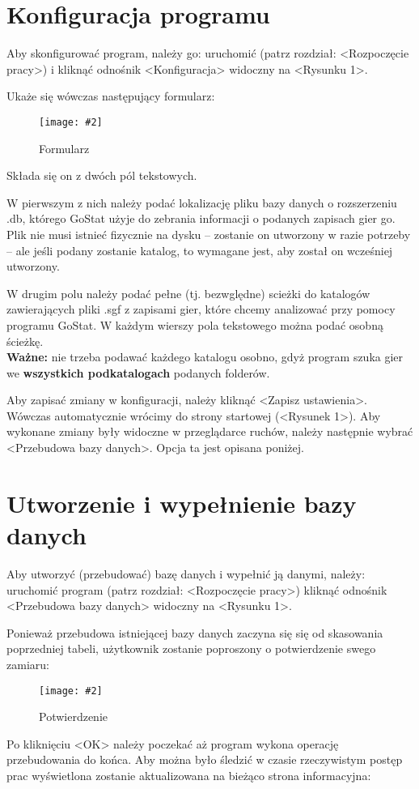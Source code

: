 \documentclass[10pt,leqno]{article}
\newcommand{\myimage}[3]{
  \begin{figure}[h!]
    \centering
      \texttt{[image: \#2]}
  \caption{#3}
  \end{figure}
}
\begin{document}
\newpage

\section{Konfiguracja programu}
Aby skonfigurować program, należy go: uruchomić (patrz rozdział: <Rozpoczęcie pracy>) i kliknąć odnośnik <Konfiguracja> widoczny na <Rysunku 1>.

Ukaże się wówczas następujący formularz:

\myimage{0.4}{formularz.png}{Formularz}

Składa się on z dwóch pól tekstowych. 

W pierwszym z nich należy podać lokalizację pliku bazy danych o rozszerzeniu .db, którego GoStat użyje do zebrania informacji o podanych zapisach gier go.
Plik nie musi istnieć fizycznie na dysku -- zostanie on utworzony w razie potrzeby -- ale jeśli podany zostanie katalog, to wymagane jest, aby został on
wcześniej utworzony.

W drugim polu należy podać pełne (tj. bezwględne) scieżki do katalogów zawierających pliki .sgf z zapisami gier, które chcemy analizować przy pomocy
programu GoStat. W każdym wierszy pola tekstowego można podać osobną ścieżkę. \\
\textbf{Ważne:} nie trzeba podawać każdego katalogu osobno, gdyż program szuka gier we \textbf{wszystkich podkatalogach} podanych folderów.

Aby zapisać zmiany w konfiguracji, należy kliknąć <Zapisz ustawienia>. Wówczas automatycznie wrócimy do strony startowej (<Rysunek 1>). 
Aby wykonane zmiany były widoczne w przeglądarce ruchów, należy następnie wybrać <Przebudowa bazy danych>. Opcja ta jest opisana poniżej.

\newpage

\section{Utworzenie i wypełnienie bazy danych}
Aby utworzyć (przebudować) bazę danych i wypełnić ją danymi, należy: 
  uruchomić program (patrz rozdział: <Rozpoczęcie pracy>)
  kliknąć odnośnik <Przebudowa bazy danych> widoczny na <Rysunku 1>.

Ponieważ przebudowa istniejącej bazy danych zaczyna się się od skasowania poprzedniej tabeli, użytkownik zostanie
poproszony o potwierdzenie swego zamiaru:

\myimage{1.0}{potwierdzenie.png}{Potwierdzenie}

Po kliknięciu <OK> należy poczekać aż program wykona operację przebudowania do końca. 
Aby można było śledzić w czasie rzeczywistym postęp prac wyświetlona zostanie aktualizowana na bieżąco strona informacyjna:
\end{document}
